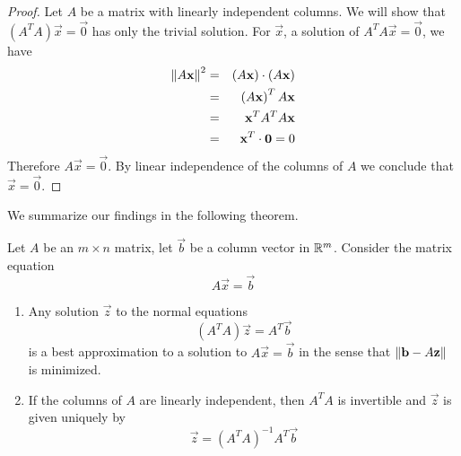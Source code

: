 \documentclass{ximera}
\begin{document}
\begin{proof}
    Let $A$ be a matrix with linearly independent columns.  We will show that $\left(A^TA\right)\vec{x}=\vec{0}$ has only the trivial solution.  For $\vec{x}$, a solution of $A^TA\vec{x}=\vec{0}$, we have
    \begin{eqnarray*}
        \left\lVert A\mathbf{x}\right\rVert^2&=&(A\mathbf{x})\cdot(A\mathbf{x})\\
        &=&\left(A\mathbf{x}\right)^TA\mathbf{x}\\
        &=&\mathbf{x}^TA^TA\mathbf{x}\\
        &=&\mathbf{x}^T\cdot\mathbf{0}=0
    \end{eqnarray*}
    Therefore $A\vec{x}=\vec{0}$.  By linear independence of the columns of $A$ we conclude that $\vec{x}=\vec{0}$.
\end{proof}    

    We summarize our findings in the following theorem.

    \begin{theorem}\label{th:bestApprox}
    Let $A$ be an $m\times n$ matrix, let $\vec{b}$ be a column vector in $\mathbb{R}^m$.  Consider the matrix equation
    $$A\vec{x}=\vec{b}$$
    \begin{enumerate}
        \item Any solution $\vec{z}$ to the normal equations 
        $$\left(A^TA\right)\vec{z}=A^T\vec{b}$$
        is a best approximation to a solution to $A\vec{x}=\vec{b}$ in the sense that $\left\lVert\mathbf{b}-A\mathbf{z}\right\rVert$ is minimized.
        \item If the columns of $A$ are linearly independent, then $A^TA$ is invertible and $\vec{z}$ is given uniquely by 
        $$\vec{z}=\left(A^TA\right)^{-1}A^T\vec{b}$$
    \end{enumerate}
    \end{theorem}
\end{document}
